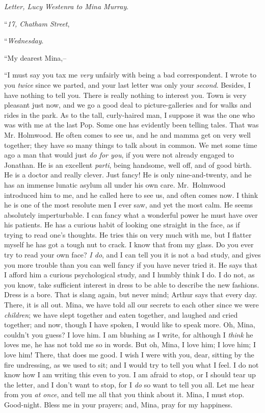 \documentclass[12pt,openright]{book}
\begin{document}
\textit{Letter, Lucy Westenra to Mina Murray}.

“\textit{17, Chatham Street},

“\textit{Wednesday}.

“My dearest Mina,–

“I must say you tax me \textit{very} unfairly with being a bad correspondent. I wrote to you \textit{twice} since we parted, and your last letter was only your \textit{second}. Besides, I have nothing to tell you. There is really nothing to interest you. Town is very pleasant just now, and we go a good deal to picture-galleries and for walks and rides in the park. As to the tall, curly-haired man, I suppose it was the one who was with me at the last Pop. Some one has evidently been telling tales. That was Mr. Holmwood. He often comes to see us, and he and mamma get on very well together; they have so many things to talk about in common. We met some time ago a man that would just \textit{do for you}, if you were not already engaged to Jonathan. He is an excellent \textit{parti}, being handsome, well off, and of good birth. He is a doctor and really clever. Just fancy! He is only nine-and-twenty, and he has an immense lunatic asylum all under his own care. Mr. Holmwood introduced him to me, and he called here to see us, and often comes now. I think he is one of the most resolute men I ever saw, and yet the most calm. He seems absolutely imperturbable. I can fancy what a wonderful power he must have over his patients. He has a curious habit of looking one straight in the face, as if trying to read one’s thoughts. He tries this on very much with me, but I flatter myself he has got a tough nut to crack. I know that from my glass. Do you ever try to read your own face? \textit{I do}, and I can tell you it is not a bad study, and gives you more trouble than you can well fancy if you have never tried it. He says that I afford him a curious psychological study, and I humbly think I do. I do not, as you know, take sufficient interest in dress to be able to describe the new fashions. Dress is a bore. That is slang again, but never mind; Arthur says that every day. There, it is all out. Mina, we have told all our secrets to each other since we were \textit{children}; we have slept together and eaten together, and laughed and cried together; and now, though I have spoken, I would like to speak more. Oh, Mina, couldn’t you guess? I love him. I am blushing as I write, for although I \textit{think} he loves me, he has not told me so in words. But oh, Mina, I love him; I love him; I love him! There, that does me good. I wish I were with you, dear, sitting by the fire undressing, as we used to sit; and I would try to tell you what I feel. I do not know how I am writing this even to you. I am afraid to stop, or I should tear up the letter, and I don’t want to stop, for I \textit{do} so want to tell you all. Let me hear from you \textit{at once}, and tell me all that you think about it. Mina, I must stop. Good-night. Bless me in your prayers; and, Mina, pray for my happiness.
\end{document}
